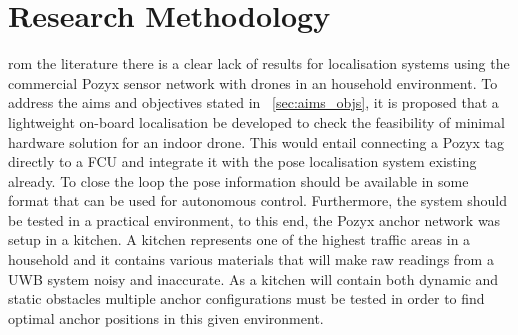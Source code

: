 \chapter{Research Methodology}\label{ch:research-methodology}
rom the literature there is a clear lack of results for localisation systems using the commercial Pozyx sensor network with drones in an household environment.
To address the aims and objectives stated in ~\ref{sec:aims_objs}, it is proposed that a lightweight on-board localisation be developed to check the feasibility of minimal hardware solution for an indoor drone.
This would entail connecting a Pozyx tag directly to a FCU and integrate it with the pose localisation system existing already.
To close the loop the pose information should be available in some format that can be used for autonomous control.
Furthermore, the system should be tested in a practical environment, to this end, the Pozyx anchor network was setup in a kitchen.
A kitchen represents one of the highest traffic areas in a household and it contains various materials that will make raw readings from a UWB system noisy and inaccurate.
As a kitchen will contain both dynamic and static obstacles multiple anchor configurations must be tested in order to find optimal anchor positions in this given environment.

